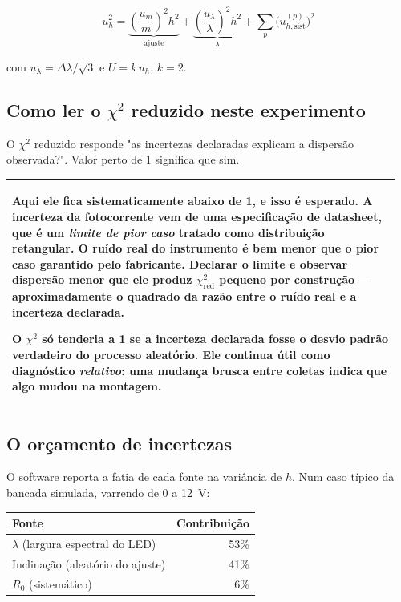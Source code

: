 \documentclass[11pt,a4paper]{article}
\newenvironment{nota}
  {\par\medskip\noindent\begin{tabular}{|p{0.96\linewidth}|}\hline\rule{0pt}{3ex}}
  {\\[1ex]\hline\end{tabular}\par\medskip}
\begin{document}
\begin{equation}
  u_h^2 = \underbrace{\left(\frac{u_m}{m}\right)^2 h^2}_{\text{ajuste}}
        + \underbrace{\left(\frac{u_\lambda}{\lambda}\right)^2 h^2}_{\lambda}
        + \sum_p \bigl(u_{h,\text{sist}}^{(p)}\bigr)^2
  \label{eq:uh}
\end{equation}

com $u_\lambda = \Delta\lambda/\sqrt{3}$ e $U = k\,u_h$, $k = 2$.

\subsection{Como ler o $\chi^2$ reduzido neste experimento}

O $\chi^2$ reduzido responde "as incertezas declaradas explicam a dispersão
observada?". Valor perto de 1 significa que sim.

\begin{nota}
\textbf{Aqui ele fica sistematicamente abaixo de 1, e isso é esperado.} A
incerteza da fotocorrente vem de uma especificação de datasheet, que é um
\emph{limite de pior caso} tratado como distribuição retangular. O ruído real
do instrumento é bem menor que o pior caso garantido pelo fabricante. Declarar
o limite e observar dispersão menor que ele produz $\chi^2_{\text{red}}$
pequeno por construção --- aproximadamente o quadrado da razão entre o ruído
real e a incerteza declarada.

O $\chi^2$ só tenderia a 1 se a incerteza declarada fosse o desvio padrão
verdadeiro do processo aleatório. Ele continua útil como diagnóstico
\emph{relativo}: uma mudança brusca entre coletas indica que algo mudou na
montagem.
\end{nota}

\subsection{O orçamento de incertezas}

O software reporta a fatia de cada fonte na variância de $h$. Num caso típico
da bancada simulada, varrendo de 0 a 12~V:

\begin{center}
\begin{tabular}{@{}lr@{}}
\toprule
\textbf{Fonte} & \textbf{Contribuição} \\
\midrule
$\lambda$ (largura espectral do LED) & 53\% \\
Inclinação (aleatório do ajuste) & 41\% \\
$R_0$ (sistemático) & 6\% \\
\bottomrule
\end{tabular}
\end{center}
\end{document}
